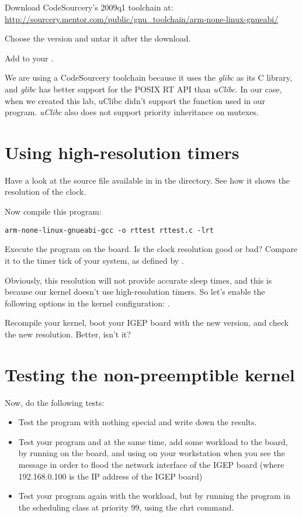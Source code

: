 Download CodeSourcery's 2009q1 toolchain at:
\url{http://sourcery.mentor.com/public/gnu_toolchain/arm-none-linux-gnueabi/}

Choose the 
version and untar it after the download.

Add  to your
.

We are using a CodeSourcery toolchain because it uses the {\em glibc}
as its C library, and {\em glibc} has better support for the POSIX RT
API than {\em uClibc}. In our case, when we created this lab, uClibc
didn't support the  function used in our
 program. {\em uClibc} also does not support priority
inheritance on mutexes.

\section{Using high-resolution timers}

Have a look at the  source file available in  in
the  directory. See how it shows the resolution of the
 clock.

Now compile this program:
\begin{verbatim}
arm-none-linux-gnueabi-gcc -o rttest rttest.c -lrt
\end{verbatim}

Execute the program on the board. Is the clock resolution good or bad?
Compare it to the timer tick of your system, as defined by .

Obviously, this resolution will not provide accurate sleep times, and
this is because our kernel doesn't use high-resolution timers. So
let's enable the following options in the kernel configuration:
.

Recompile your kernel, boot your IGEP board with the new version, and
check the new resolution. Better, isn't it?

\section{Testing the non-preemptible kernel}

Now, do the following tests:
\begin{itemize}
\item Test the program with nothing special and write down the
  results.
\item Test your program and at the same time, add some workload to the
  board, by running  on the board,
  and using  on your workstation when
  you see the message  in order to
  flood the network interface of the IGEP board (where 192.168.0.100
  is the IP address of the IGEP board)
\item Test your program again with the workload, but by running the
  program in the  scheduling class at priority 99,
  using the chrt command.
\end{itemize}

